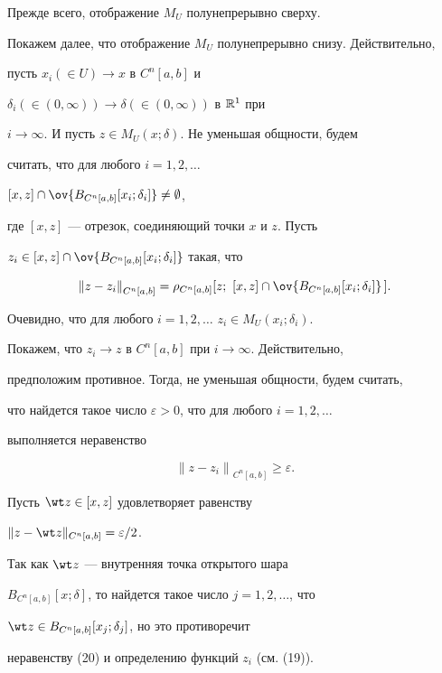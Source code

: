 \begin{pf} Прежде всего, отображение $M_U$ полунепрерывно сверху.


Покажем далее, что отображение $M_U$ полунепрерывно снизу. Действительно,


пусть $x_i(\in U)\to x$ в $C^n[a,b]$ и


$\delta_i(\in(0,\infty))\to\delta(\in(0,\infty))$ в $\Bbb R^1$ при


$i\to\infty$. И пусть $z\in M_U(x;\delta)$. Не уменьшая общности, будем


считать, что для любого $i=1,2,\dotsc$\;


$[x,z]\cap\ov{B_{C^n[a,b]}[x_i;\delta_i]}\ne\emptyset$,


где $[x,z]$ --- отрезок, соединяющий точки $x$ и $z$. Пусть


$z_i\in[x,z]\cap\ov{B_{C^n[a,b]}[x_i;\delta_i]}$ такая, что


\begin{equation}


{\|z-z_i\|}_{C^n[a,b]}=\rho_{C^n[a,b]}[z;\ [x,z]\cap


\ov{B_{C^n[a,b]}[x_i;\delta_i]}\,].


\end{equation}


Очевидно, что для любого $i=1,2,\dotsc$\; $z_i\in M_U(x_i;\delta_i)$.


Покажем, что $z_i\to z$ в $C^n[a,b]$ при $i\to\infty$. Действительно,


предположим противное. Тогда, не уменьшая общности, будем считать,


что найдется такое число $\varepsilon>0$, что для любого $i=1,2,\dotsc$


выполняется неравенство


\begin{equation}


{\|z-z_i\|}_{C^n[a,b]}\ge\varepsilon.


\end{equation}


Пусть $\wt z\in[x,z]$ удовлетворяет равенству


$\|z-\wt z\|_{C^n[a,b]}=\varepsilon/2$.


Так как $\wt z$ --- внутренняя точка открытого шара


$B_{C^n[a,b]}[x;\delta]$, то найдется такое число $j=1,2,\dotsc$, что


$\wt z\in B_{C^n[a,b]}[x_j;\delta_j]$, но это противоречит


неравенству (20) и определению функций $z_i$ (см. (19)).


\end{pf}






